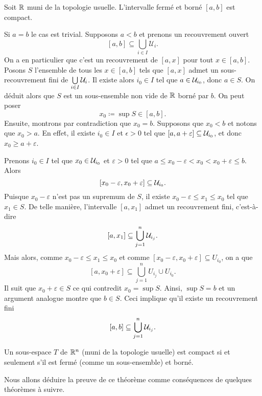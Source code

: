 \documentclass[french]{article}
\begin{document}
\begin{propo}
  Soit $\mathbb{R}$ muni de la topologie usuelle. L'intervalle fermé et borné $[a, b]$ est compact.

  \tcblower
  \begin{preuve}
    Si $a=b$ le cas est trivial. Supposons $a < b$ et prenons un recouvrement ouvert
    $$[a, b] \subseteq \bigcup_{i \in I} \mathcal{U}_i.$$
    On a en particulier que c'est un recouvrement de $[a, x]$ pour tout $x \in [a, b]$. Posons $S$ l'ensemble de tous les $x\in [a, b]$ tels que $[a, x]$ admet un sous-recouvrement fini de $\bigcup\limits_{i \in I} \mathcal{U}_i$. Il existe alors $i_0 \in I$ tel que $a \in \mathcal{U}_{i_0}$, donc $a \in S$.
    On déduit alors que $S$ est un sous-ensemble non vide de $\mathbb{R}$ borné par $b$. On peut poser
    $$x_0 \coloneq \sup S \in [a, b].$$
    Ensuite, montrons par contradiction que $x_0 = b$. Supposons que $x_0 < b$ et notons que $x_0 > a$. En effet, il existe  $i_0 \in I$ et $\epsilon > 0$ tel que  $[a, a+\varepsilon] \subseteq \mathcal{U}_{i_0}$, et donc $x_0 \geq a + \varepsilon$.
    \par Prenons $i_0 \in I$ tel que $x_0 \in \mathcal{U}_{i_0}$ et $\varepsilon > 0$ tel que  $a \leq x_0 - \varepsilon < x_0 < x_0 + \varepsilon \leq b$. Alors
    $$[x_0 - \varepsilon, x_0 + \varepsilon] \subseteq \mathcal{U}_{i_0}.$$
    Puisque $x_0 - \varepsilon$ n'est pas un supremum de $S$, il existe $x_0 - \varepsilon \leq x_1 \leq x_0$ tel que $x_1 \in S$. De telle manière, l'intervalle $[a, x_1]$ admet un recouvrement fini, c'est-à-dire
    $$[a, x_1] \subseteq \bigcup_{j=1}^n \mathcal{U}_{i_j}.$$
    Mais alors, comme $x_0 - \varepsilon \leq x_1 \leq x_0$ et comme $[x_0 - \varepsilon, x_0+\varepsilon] \subseteq U_{i_0}$, on a que
    $$[a, x_0+\varepsilon] \subseteq \bigcup_{j=1}^n U_{i_j} \cup U_{i_0}.$$
    Il suit que $x_0 + \varepsilon \in S$ ce qui contredit $x_0 = \sup S$. Ainsi, $\sup S = b$ et un argument analogue montre que  $b \in S$. Ceci implique qu'il existe un recouvrement fini
    $$[a, b] \subseteq \bigcup_{j=1}^n \mathcal{U}_{i_j}.$$
  \end{preuve}
\end{propo}

\begin{theoreme}\label{thm:borel}
  Un sous-espace $T$ de $\mathbb{R}^n$ (muni de la topologie usuelle) est compact si et seulement s'il est fermé (comme un sous-ensemble) et borné.
\end{theoreme}
Nous allons déduire la preuve de ce théorème comme conséquences de quelques théorèmes à suivre.
\end{document}
